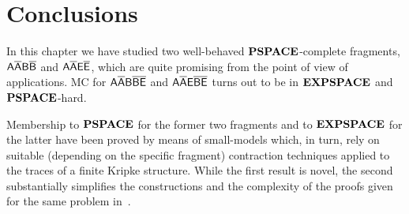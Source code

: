 \section{Conclusions}
In this chapter we have studied two well-behaved $\textbf{PSPACE}$-complete fragments, $\mathsf{A\overline{A}B\overline{B}}$ and $\mathsf{A\overline{A}E\overline{E}}$, which
are quite promising from the point of view of applications.
MC for $\mathsf{A\overline{A}B\overline{B}\overline{E}}$ and
$\mathsf{A\overline{A}E\overline{B}\overline{E}}$ turns out to be in $\textbf{EXPSPACE}$ and $\textbf{PSPACE}$-hard.

Membership to $\textbf{PSPACE}$ for the former two fragments and to $\textbf{EXPSPACE}$ for the latter have been proved by means of
small-models which, in turn, rely on suitable (depending on the specific fragment) contraction techniques applied to the traces of a finite Kripke structure.
While the first result is novel, the second 
substantially simplifies the constructions and the complexity of the proofs
given for the same problem in~\cite{MMP15}.
